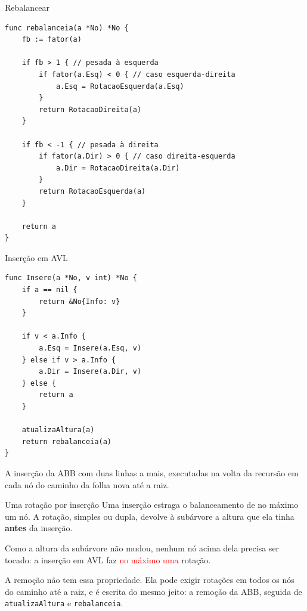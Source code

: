 \documentclass{beamer}
\newcommand{\tcr}[1]{\textcolor{red}{#1}}
\begin{document}
\begin{frame}[fragile]{Rebalancear}
\begin{verbatim}
func rebalanceia(a *No) *No {
	fb := fator(a)

	if fb > 1 { // pesada à esquerda
		if fator(a.Esq) < 0 { // caso esquerda-direita
			a.Esq = RotacaoEsquerda(a.Esq)
		}
		return RotacaoDireita(a)
	}

	if fb < -1 { // pesada à direita
		if fator(a.Dir) > 0 { // caso direita-esquerda
			a.Dir = RotacaoDireita(a.Dir)
		}
		return RotacaoEsquerda(a)
	}

	return a
}
\end{verbatim}
\end{frame}

\begin{frame}[fragile]{Inserção em AVL}
\begin{verbatim}
func Insere(a *No, v int) *No {
	if a == nil {
		return &No{Info: v}
	}

	if v < a.Info {
		a.Esq = Insere(a.Esq, v)
	} else if v > a.Info {
		a.Dir = Insere(a.Dir, v)
	} else {
		return a
	}

	atualizaAltura(a)
	return rebalanceia(a)
}
\end{verbatim}

  \vspace{0.2cm}
  A inserção da ABB com duas linhas a mais, executadas na volta da recursão em
  cada nó do caminho da folha nova até a raiz.
\end{frame}

\begin{frame}{Uma rotação por inserção}
  Uma inserção estraga o balanceamento de no máximo um nó. A rotação, simples ou
  dupla, devolve à subárvore a altura que ela tinha \textbf{antes} da inserção.

  \vspace{0.3cm}
  Como a altura da subárvore não mudou, nenhum nó acima dela precisa ser tocado:
  a inserção em AVL faz \tcr{no máximo uma} rotação.

  \vspace{0.5cm}
  A remoção não tem essa propriedade. Ela pode exigir rotações em todos os nós
  do caminho até a raiz, e é escrita do mesmo jeito: a remoção da ABB, seguida
  de \texttt{atualizaAltura} e \texttt{rebalanceia}.
\end{frame}
\end{document}
